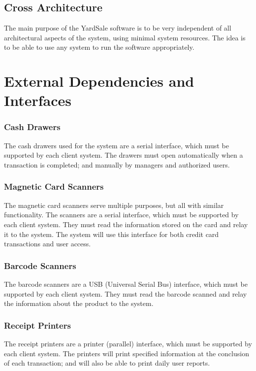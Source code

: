 \documentclass{report}
\begin{document}
    \subsection{Cross Architecture}
    The main purpose of the YardSale software is to be very
    independent of all architectural aspects of the system, using
    minimal system resources.  The idea is to be able to use any system
    to run the software appropriately.

\section{External Dependencies and Interfaces}

    \subsubsection{Cash Drawers}
    The cash drawers used for the system are a serial interface,
    which must be supported by each client system.  The drawers
    must open automatically when a transaction is completed; and
    manually by managers and authorized users.

    \subsubsection{Magnetic Card Scanners}
    The magnetic card scanners serve multiple purposes, but all with
    similar functionality.  The scanners are a serial interface,
    which must be supported by each client system.  They must read the
    information stored on the card and relay it to the system.
    The system will use this interface for both credit card
    transactions and user access.

    \subsubsection{Barcode Scanners}
    The barcode scanners are a USB (Universal Serial Bus)
    interface, which must be supported by each client system.  They must
    read the barcode scanned and relay the information about the
    product to the system.

    \subsubsection{Receipt Printers}
    The receipt printers are a printer (parallel) interface, which
    must be supported by each client system.  The printers
    will print specified information at the conclusion of each
    transaction; and will also be able to print daily user reports.
\end{document}

